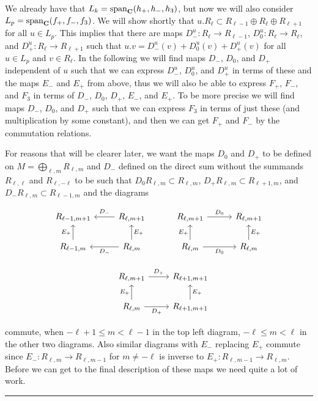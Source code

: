 We already have that $L_k=\operatorname{span}_{\mathbf{C}}(h_+,h_-,h_3)$, but now we will also consider $L_p=\operatorname{span}_{\mathbf{C}}(f_+,f_-,f_3)$. We will show shortly that $u.R_\ell \subset R_{\ell-1}\oplus R_\ell \oplus R_{\ell+1}$ for all $u\in L_p$. This implies that there are maps $D_-^{u}\colon R_\ell\to R_{\ell-1}$, $D_0^{u}\colon R_\ell\to R_\ell$, and $D_+^{u}\colon R_\ell\to R_{\ell+1}$ such that $u.v=D_-^{u}(v)+D_0^{u}(v)+D_+^{u}(v)$ for all $u\in L_p$ and $v\in R_\ell$. In the following we will find maps $D_-$, $D_0$, and $D_+$ independent of $u$ such that we can express $D_-^{u}$, $D_0^{u}$, and $D_+^{u}$ in terms of these and the maps $E_-$ and $E_+$ from above, thus we will also be able to express $F_+$, $F_-$, and $F_3$ in terms of $D_-$, $D_0$, $D_+$, $E_-$, and $E_+$. To be more precise we will find maps $D_-$, $D_0$, and $D_+$ such that we can express $F_3$ in terms of just these (and multiplication by some constant), and then we can get $F_+$ and $F_-$ by the commutation relations. 

For reasons that will be clearer later, we want the maps $D_0$ and $D_+$ to be defined on $M=\bigoplus_{\ell,m} R_{\ell,m}$ and $D_-$ defined on the direct sum without the summands $R_{\ell,\ell}$ and $R_{\ell,-\ell}$ to be such that $D_0 R_{\ell,m}\subset R_{\ell,m}$, $D_+ R_{\ell,m} \subset R_{\ell+1,m}$, and $D_- R_{\ell,m} \subset R_{\ell-1,m}$ and the diagrams
\begin{center}
  \begin{equation}\label{eq:Ddiagrams}
    \begin{tikzcd}[baseline=(current bounding box.center)]
      R_{\ell-1,m+1} & R_{\ell,m+1} \ar[l,"D_-",swap] & R_{\ell,m+1} \ar[r,"D_0"] & R_{\ell,m+1}  \\
      R_{\ell-1,m} \ar[u,"E_+"] & R_{\ell,m} \ar[l,"D_-"] \ar[u,"E_+",swap] & R_{\ell,m} \ar[r,"D_0",swap] \ar[u,"E_+"] & R_{\ell,m} \ar[u,"E_+",swap] \\
      & R_{\ell,m+1} \ar[r,"D_+"] & R_{\ell+1,m+1} \\
      & R_{\ell,m} \ar[u,"E_+"] \ar[r,"D_+",swap] & R_{\ell+1,m+1} \ar[u,"E_+",swap]
    \end{tikzcd}
  \end{equation}
\end{center}
commute, when $-\ell+1\leq m < \ell-1$ in the top left diagram, $-\ell\leq m<\ell$ in the other two diagrams. Also similar diagrams with $E_-$ replacing $E_+$ commute since $E_-\colon R_{\ell,m}\to R_{\ell,m-1}$ for $m\neq -\ell$ is inverse to $E_+\colon R_{\ell,m-1}\to R_{\ell,m}$. Before we can get to the final description of these maps we need quite a lot of work.\fancybreak{* \quad * \quad * \quad * \quad *}

